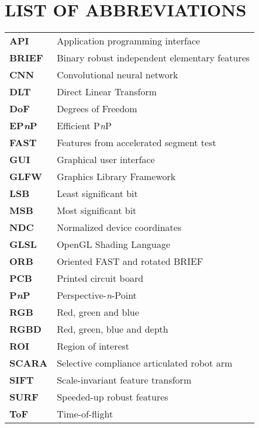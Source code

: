 
\section*{LIST OF ABBREVIATIONS}

\begin{tabular}{p{3cm}l}
  
  	\textbf{API}			& Application programming interface \\
  	\textbf{BRIEF}			& Binary robust independent elementary features \\
	\textbf{CNN} 			& Convolutional neural network \\
	\textbf{DLT}			& Direct Linear Transform \\
	\textbf{DoF}			& Degrees of Freedom \\
	\textbf{EP\textit{n}P}	& Efficient P\textit{n}P \\
	\textbf{FAST}			& Features from accelerated segment test \\
	\textbf{GUI}			& Graphical user interface \\
	\textbf{GLFW}			& Graphics Library Framework \\
	\textbf{LSB}			& Least significant bit \\
	\textbf{MSB}			& Most significant bit \\
	\textbf{NDC}			& Normalized device coordinates \\
	\textbf{GLSL}			& OpenGL Shading Language \\
	\textbf{ORB}			& Oriented FAST and rotated BRIEF \\
	\textbf{PCB}			& Printed circuit board \\
	\textbf{P\textit{n}P}	& Perspective-\textit{n}-Point \\
	\textbf{RGB}			& Red, green and blue \\
	\textbf{RGBD}			& Red, green, blue and depth \\
	\textbf{ROI}			& Region of interest \\
	\textbf{SCARA}			& Selective compliance articulated robot arm \\
	\textbf{SIFT}			& Scale-invariant feature transform \\
	\textbf{SURF}			& Speeded-up robust features \\
	\textbf{ToF}			& Time-of-flight \\
	

\end{tabular}

